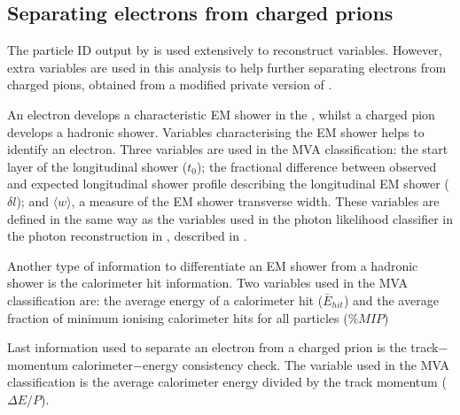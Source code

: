 \subsection{Separating electrons from charged prions}

The particle ID output by \pandora is used extensively to reconstruct variables. However, extra variables are used in this analysis to help further separating  electrons from charged pions, obtained from a modified private version of \pandora.



An electron develops a characteristic EM shower in the \ECAL, whilst a charged pion develops a hadronic shower. Variables characterising the  EM shower helps to identify an electron. Three variables are used in the MVA classification: the start layer of the longitudinal shower ($t_0$); the fractional difference between observed and expected longitudinal shower profile describing the longitudinal EM shower ($\delta{l}$); and $\langle{w}\rangle$, a measure of the EM shower transverse width. These variables are defined in the same way as the variables used in the photon likelihood classifier in the photon reconstruction in \pandora, described in .

Another type of information to differentiate an EM shower from a hadronic shower is the calorimeter hit information. Two variables used in the MVA classification are: the average energy of a calorimeter hit ($\bar{E}_{hit}$) and the average fraction of minimum ionising calorimeter hits for all particles ($\%MIP$)

Last information used to separate an electron  from a charged prion is the track$-$momentum calorimeter$-$energy consistency check. The variable used in the MVA classification is the average calorimeter energy divided by the track momentum ($\Delta E/P$).








